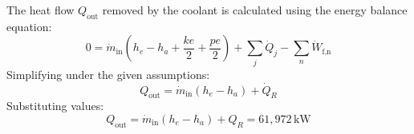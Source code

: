 The heat flow \( Q_{\text{out}} \) removed by the coolant is calculated using the energy balance equation:  
\[
0 = \dot{m}_{\text{in}} \left( h_e - h_a + \frac{ke}{2} + \frac{pe}{2} \right) + \sum_j \dot{Q}_j - \sum_n \dot{W}_{\text{f,n}}
\]  
Simplifying under the given assumptions:  
\[
Q_{\text{out}} = \dot{m}_{\text{in}} (h_e - h_a) + \dot{Q}_R
\]  
Substituting values:  
\[
Q_{\text{out}} = \dot{m}_{\text{in}} (h_e - h_a) + Q_R = 61,972 \, \text{kW}
\]